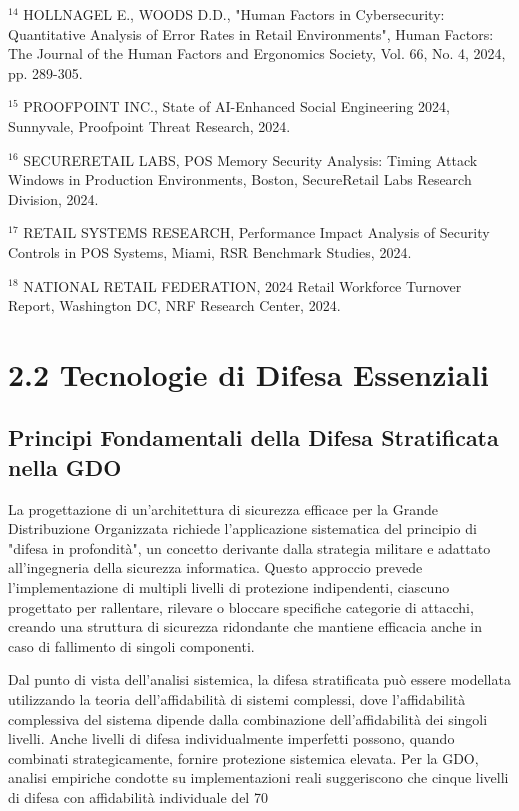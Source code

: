 {$^{14}$ HOLLNAGEL E., WOODS D.D., "Human Factors in Cybersecurity: Quantitative Analysis of Error Rates in Retail Environments", Human Factors: The Journal of the Human Factors and Ergonomics Society, Vol. 66, No. 4, 2024, pp. 289-305.

$^{15}$ PROOFPOINT INC., State of AI-Enhanced Social Engineering 2024, Sunnyvale, Proofpoint Threat Research, 2024.

$^{16}$ SECURERETAIL LABS, POS Memory Security Analysis: Timing Attack Windows in Production Environments, Boston, SecureRetail Labs Research Division, 2024.

$^{17}$ RETAIL SYSTEMS RESEARCH, Performance Impact Analysis of Security Controls in POS Systems, Miami, RSR Benchmark Studies, 2024.

$^{18}$ NATIONAL RETAIL FEDERATION, 2024 Retail Workforce Turnover Report, Washington DC, NRF Research Center, 2024.

\section{2.2 Tecnologie di Difesa Essenziali}

\subsection{Principi Fondamentali della Difesa Stratificata nella GDO}

La progettazione di un'architettura di sicurezza efficace per la Grande Distribuzione Organizzata richiede l'applicazione sistematica del principio di "difesa in profondità", un concetto derivante dalla strategia militare e adattato all'ingegneria della sicurezza informatica. Questo approccio prevede l'implementazione di multipli livelli di protezione indipendenti, ciascuno progettato per rallentare, rilevare o bloccare specifiche categorie di attacchi, creando una struttura di sicurezza ridondante che mantiene efficacia anche in caso di fallimento di singoli componenti.

Dal punto di vista dell'analisi sistemica, la difesa stratificata può essere modellata utilizzando la teoria dell'affidabilità di sistemi complessi, dove l'affidabilità complessiva del sistema dipende dalla combinazione dell'affidabilità dei singoli livelli. Anche livelli di difesa individualmente imperfetti possono, quando combinati strategicamente, fornire protezione sistemica elevata. Per la GDO, analisi empiriche condotte su implementazioni reali suggeriscono che cinque livelli di difesa con affidabilità individuale del 70%

}
